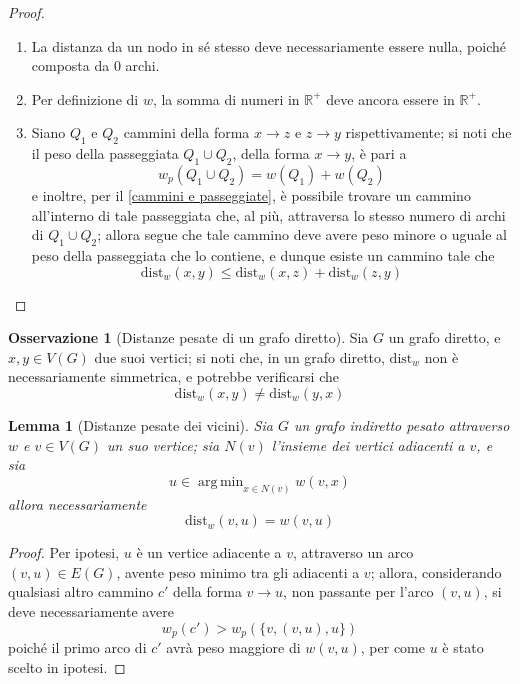 \documentclass[14pt]{extreport}
\DeclareMathOperator*{\argmin}{arg\,min}
\newtheorem{lemma}{Lemma}[subsection]
\theoremstyle{definition}
\theoremstyle{definition}
\newtheorem{remark}{Osservazione}[subsection]
\begin{document}
\begin{proof}
    \hspace{0.7cm}
    \begin{enumerate}[\itshape i)]
        \item La distanza da un nodo in sé stesso deve necessariamente essere nulla, poiché composta da 0 archi.
        \item Per definizione di $w$, la somma di numeri in $\mathbb{R}^+$ deve ancora essere in $\mathbb{R}^+$.
        \item Siano $Q_1$ e $Q_2$ cammini della forma $x \rightarrow z$ e $z \rightarrow y$ rispettivamente; si noti che il peso della passeggiata $Q_1 \cup Q_2$, della forma $x \rightarrow y$, è pari a $$w_p(Q_1 \cup Q_2) = w(Q_1) + w(Q_2)$$ e inoltre, per il \cref{cammini e passeggiate}, è possibile trovare un cammino all'interno di tale passeggiata che, al più, attraversa lo stesso numero di archi di $Q_1 \cup Q_2$; allora segue che tale cammino deve avere peso minore o uguale al peso della passeggiata che lo contiene, e dunque esiste un cammino tale che $$\mathrm{dist}_w(x, y) \le \mathrm{dist}_w(x, z) + \mathrm{dist}_w(z, y)$$
    \end{enumerate}
\end{proof}

\begin{remark}[Distanze pesate di un grafo diretto]
    Sia $G$ un grafo diretto, e $x, y \in V(G)$ due suoi vertici; si noti che, in un grafo diretto, $\mathrm{dist}_w$ non è necessariamente simmetrica, e potrebbe verificarsi che $$\mathrm{dist}_w(x, y) \neq \mathrm{dist}_w(y, x)$$
\end{remark}

\begin{lemma}[Distanze pesate dei vicini]
    \label{vicini pesati}
    Sia $G$ un grafo indiretto pesato attraverso $w$ e $v \in V(G)$ un suo vertice; sia $N(v)$ l'insieme dei vertici adiacenti a $v$, e sia $$u \in \argmin_{x \in N(v)}{w(v, x)}$$ allora necessariamente $$\mathrm{dist}_w(v, u) = w(v, u)$$
\end{lemma}

\begin{proof}
    Per ipotesi, $u$ è un vertice adiacente a $v$, attraverso un arco $(v, u) \in E(G)$, avente peso minimo tra gli adiacenti a $v$; allora, considerando qualsiasi altro cammino $c'$ della forma $v \rightarrow u$, non passante per l'arco $(v, u)$, si deve necessariamente avere $$w_p(c') > w_p(\{v, (v, u), u\})$$ poiché il primo arco di $c'$ avrà peso maggiore di $w(v, u)$, per come $u$ è stato scelto in ipotesi.
\end{proof}
\end{document}
